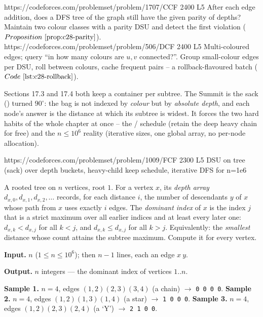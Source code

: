 \begin{mixedset}
    {https://codeforces.com/problemset/problem/1707/C}{CF 2400 L5}
    {After each edge addition, does a DFS tree of the graph still have the given
     parity of depths? Maintain two colour classes with a parity DSU and detect
     the first violation (\(\propref{c28-parity}\)).}
    {https://codeforces.com/problemset/problem/506/D}{CF 2400 L5}
    {Multi-coloured edges; query ``in how many colours are \(u,v\) connected?''.
     Group small-colour edges per DSU, roll between colours, cache frequent
     pairs -- a rollback-flavoured batch (\(\coderef{c28-rollback}\)).}
\end{mixedset}


\begin{notebox}
Sections 17.3 and 17.4 both keep a container per subtree. The Summit is the
sack () turned \(90^\circ\): the bag is not indexed by
\emph{colour} but by \emph{absolute depth}, and each node's answer is the
distance at which its subtree is widest. It forces the two hard habits of the
whole chapter at once -- the / schedule (retain the deep
heavy chain for free) and the \(n\le 10^6\) reality (iterative sizes, one
global array, no per-node allocation).
\end{notebox}

  {https://codeforces.com/problemset/problem/1009/F}{CF 2300 L5}
  {DSU on tree (sack) over depth buckets, heavy-child keep schedule, iterative DFS for n=1e6}

\begin{problemstatement}
A rooted tree on \(n\) vertices, root \(1\). For a vertex \(x\), its
\emph{depth array} \(d_{x,0},d_{x,1},d_{x,2},\dots\) records, for each
distance \(i\), the number of descendants \(y\) of \(x\) whose path from \(x\)
uses exactly \(i\) edges. The \emph{dominant index} of \(x\) is the index \(j\)
that is a strict maximum over all earlier indices and at least every later one:
\(d_{x,k}<d_{x,j}\) for all \(k<j\), and \(d_{x,k}\le d_{x,j}\) for all
\(k>j\). Equivalently: the \emph{smallest} distance whose count attains the
subtree maximum. Compute it for every vertex.

\textbf{Input.} \(n\) (\(1\le n\le 10^6\)); then \(n-1\) lines, each an edge
\(x\ y\).

\textbf{Output.} \(n\) integers --- the dominant index of vertices \(1..n\).

\textbf{Sample 1.} \(n=4\), edges \((1,2)(2,3)(3,4)\) (a chain)
\(\to\) \texttt{0 0 0 0}. \quad
\textbf{Sample 2.} \(n=4\), edges \((1,2)(1,3)(1,4)\) (a star)
\(\to\) \texttt{1 0 0 0}. \quad
\textbf{Sample 3.} \(n=4\), edges \((1,2)(2,3)(2,4)\) (a `Y')
\(\to\) \texttt{2 1 0 0}.
\end{problemstatement}

